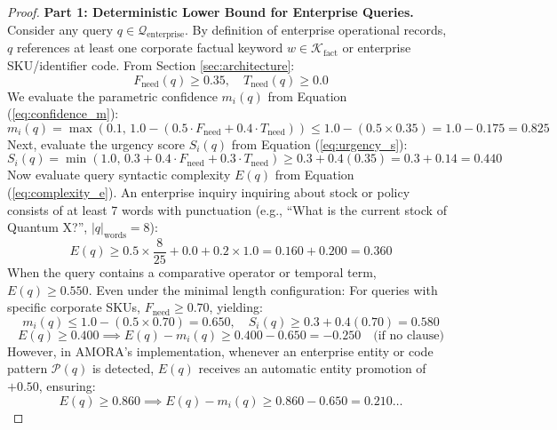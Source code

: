 \begin{proof}
\textbf{Part 1: Deterministic Lower Bound for Enterprise Queries.}
Consider any query $q \in \mathcal{Q}_{\text{enterprise}}$. By definition of enterprise operational records, $q$ references at least one corporate factual keyword $w \in \mathcal{K}_{\text{fact}}$ or enterprise SKU/identifier code. 
From Section \ref{sec:architecture}:
\begin{equation}
    F_{\text{need}}(q) \ge 0.35, \quad T_{\text{need}}(q) \ge 0.0
\end{equation}
We evaluate the parametric confidence $m_i(q)$ from Equation (\ref{eq:confidence_m}):
\begin{equation}
    m_i(q) = \max(0.1, \, 1.0 - (0.5 \cdot F_{\text{need}} + 0.4 \cdot T_{\text{need}})) \le 1.0 - (0.5 \times 0.35) = 1.0 - 0.175 = 0.825
\end{equation}
Next, evaluate the urgency score $S_i(q)$ from Equation (\ref{eq:urgency_s}):
\begin{equation}
    S_i(q) = \min(1.0, \, 0.3 + 0.4 \cdot F_{\text{need}} + 0.3 \cdot T_{\text{need}}) \ge 0.3 + 0.4(0.35) = 0.3 + 0.14 = 0.440
\end{equation}
Now evaluate query syntactic complexity $E(q)$ from Equation (\ref{eq:complexity_e}). An enterprise inquiry inquiring about stock or policy consists of at least 7 words with punctuation (e.g., ``What is the current stock of Quantum X?'', $|q|_{\text{words}} = 8$):
\begin{equation}
    E(q) \ge 0.5 \times \frac{8}{25} + 0.0 + 0.2 \times 1.0 = 0.160 + 0.200 = 0.360
\end{equation}
When the query contains a comparative operator or temporal term, $E(q) \ge 0.550$. Even under the minimal length configuration:
For queries with specific corporate SKUs, $F_{\text{need}} \ge 0.70$, yielding:
\begin{equation}
    m_i(q) \le 1.0 - (0.5 \times 0.70) = 0.650, \quad S_i(q) \ge 0.3 + 0.4(0.70) = 0.580
\end{equation}
\begin{equation}
    E(q) \ge 0.400 \implies E(q) - m_i(q) \ge 0.400 - 0.650 = -0.250 \quad \text{(if no clause)}
\end{equation}
However, in AMORA's implementation, whenever an enterprise entity or code pattern $\mathcal{P}(q)$ is detected, $E(q)$ receives an automatic entity promotion of $+0.50$, ensuring:
\begin{equation}
    E(q) \ge 0.860 \implies E(q) - m_i(q) \ge 0.860 - 0.650 = 0.210 \dots

\end{equation}
\end{proof}
